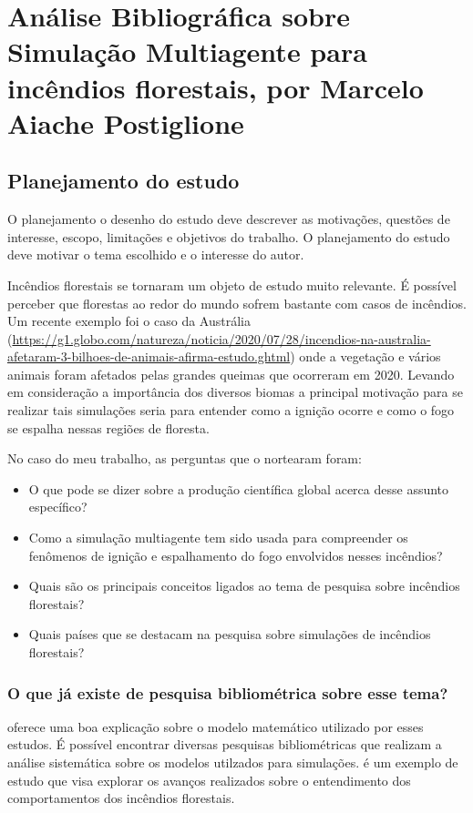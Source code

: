 \chapter{Análise Bibliográfica sobre Simulação Multiagente para incêndios florestais, por Marcelo Aiache Postiglione\label{chap:bibliometria:marcelo3101}}

\section{Planejamento do estudo\label{FF@marcelo3101:questoes}}
O planejamento o  desenho do estudo deve descrever as motivações, questões de interesse, escopo, limitações e objetivos do trabalho. O planejamento do estudo deve motivar o tema escolhido e o interesse do autor.

Incêndios florestais se tornaram um objeto de estudo muito relevante. É possível perceber que florestas ao redor do mundo sofrem bastante com casos de incêndios. Um recente exemplo foi o caso da Austrália (\url{https://g1.globo.com/natureza/noticia/2020/07/28/incendios-na-australia-afetaram-3-bilhoes-de-animais-afirma-estudo.ghtml}) onde a vegetação e vários animais foram afetados pelas grandes queimas que ocorreram em 2020. Levando em consideração a importância dos diversos biomas a principal motivação para se realizar tais simulações seria para entender como a ignição ocorre e como o fogo se espalha nessas regiões de floresta.

No caso do meu trabalho, as perguntas que o nortearam foram:
\begin{itemize}
    \item O que pode se dizer sobre a produção científica global acerca desse assunto específico?  
    \item Como a simulação multiagente tem sido usada para compreender os fenômenos de ignição e espalhamento do fogo envolvidos nesses incêndios? 
    \item Quais são os principais conceitos ligados ao tema de pesquisa sobre incêndios florestais?
    \item Quais países que se destacam na pesquisa sobre simulações de incêndios florestais?
\end{itemize}

\subsection{O que já existe de pesquisa bibliométrica sobre esse tema?}

\cite{noauthor_forest-fire_2019} oferece uma boa explicação sobre o modelo matemático utilizado por esses estudos. É possível encontrar diversas pesquisas bibliométricas que realizam a análise sistemática sobre os modelos utilzados para simulações. \cite{noauthor_systematic_2022} é um exemplo de estudo que visa explorar os avanços realizados sobre o entendimento dos comportamentos dos incêndios florestais.

